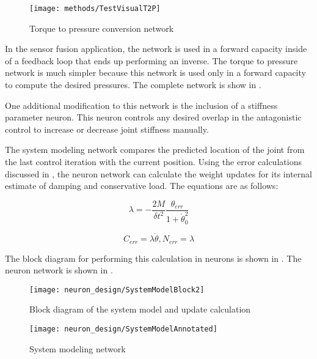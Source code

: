 \begin{figure}[htb!]
\centering
\texttt{[image: methods/TestVisualT2P]}
\caption{Torque to pressure conversion network}
\label{fig:T2PNetwork}
\end{figure}

In the sensor fusion application,
the network is used in a forward capacity inside of a feedback loop that ends
up performing an inverse. The torque to pressure network is much simpler because this network
is used only in a forward capacity to compute the desired pressures. The complete network is show in .

One additional modification to this network is the inclusion of a stiffness
parameter neuron. This neuron controls any desired overlap in the antagonistic control
to increase or decrease joint stiffness manually.


The system modeling network compares the predicted location of the joint from 
the last control iteration with the current position. Using the error 
calculations discussed in , the neuron network
can calculate the weight updates for its internal estimate of damping and 
conservative load. The equations are as follows:

\begin{equation}
\lambda 
=
- \dfrac{2M}{\delta t^{2}} \dfrac{\theta_{err}}{1 + \dot{\theta}_{0}^{2}}
\end{equation}

\begin{equation}
C_{err} = \lambda \dot{\theta}, N_{err} = \lambda
\end{equation}

The block diagram for performing this calculation in neurons is shown in . The neuron network is shown in .

\begin{figure}
\centering
\texttt{[image: neuron\_design/SystemModelBlock2]}
\caption{Block diagram of the system model and update calculation}
\label{fig:SystemModelBlock}
\end{figure}

\begin{figure}
\centering
\texttt{[image: neuron\_design/SystemModelAnnotated]}
\caption{System modeling network}
\label{fig:SystemModelNetwork}
\end{figure}

